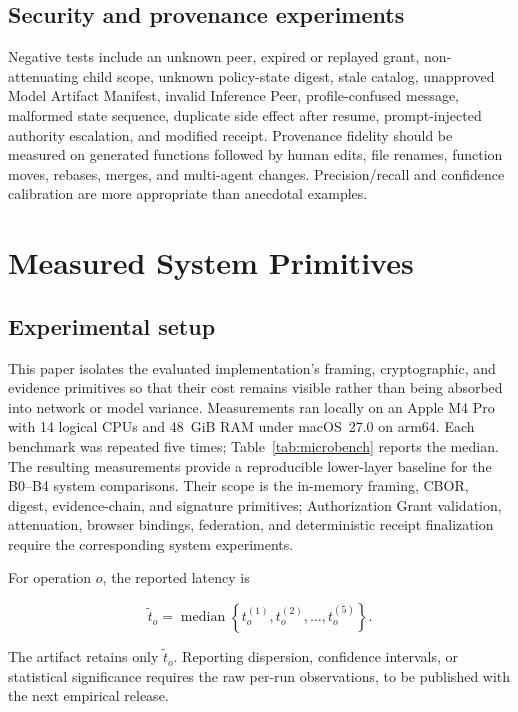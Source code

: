 \documentclass[10pt]{article}
\begin{document}
\subsection{Security and provenance experiments}

Negative tests include an unknown peer, expired or replayed grant, non-attenuating child scope, unknown policy-state digest, stale catalog, unapproved Model Artifact Manifest, invalid Inference Peer, profile-confused message, malformed state sequence, duplicate side effect after resume, prompt-injected authority escalation, and modified receipt. Provenance fidelity should be measured on generated functions followed by human edits, file renames, function moves, rebases, merges, and multi-agent changes. Precision/recall and confidence calibration are more appropriate than anecdotal examples.

\section{Measured System Primitives}

\subsection{Experimental setup}

This paper isolates the evaluated implementation's framing, cryptographic, and evidence primitives so that their cost remains visible rather than being absorbed into network or model variance. Measurements ran locally on an Apple M4 Pro with 14 logical CPUs and 48~GiB RAM under macOS~27.0 on arm64. Each benchmark was repeated five times; Table~\ref{tab:microbench} reports the median. The resulting measurements provide a reproducible lower-layer baseline for the B0--B4 system comparisons. Their scope is the in-memory framing, CBOR, digest, evidence-chain, and signature primitives; Authorization Grant validation, attenuation, browser bindings, federation, and deterministic receipt finalization require the corresponding system experiments.

For operation $o$, the reported latency is

\begin{equation}
\widetilde{t}_o = \operatorname{median}
  \left\{t_o^{(1)},t_o^{(2)},\ldots,t_o^{(5)}\right\}.
\label{eq:median}
\end{equation}

The artifact retains only $\widetilde{t}_o$. Reporting dispersion, confidence intervals, or statistical significance requires the raw per-run observations, to be published with the next empirical release.
\end{document}
